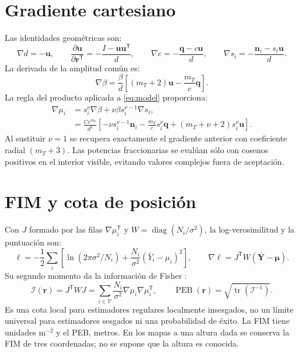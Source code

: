 \documentclass[11pt,a4paper]{article}
\newcommand{\PEB}{\operatorname{PEB}}
\begin{document}
\section{Gradiente cartesiano}
Las identidades geométricas son:
\begin{equation}
 \nabla d=-\mathbf u,\qquad
 \frac{\partial\mathbf u}{\partial\mathbf r^{\mathsf T}}=-\frac{I-\mathbf u\mathbf u^{\mathsf T}}{d},\qquad
 \nabla c=-\frac{\mathbf q-c\mathbf u}{d},\qquad
 \nabla s_i=-\frac{\mathbf n_i-s_i\mathbf u}{d}.
\end{equation}
La derivada de la amplitud común es:
\begin{equation}
 \nabla\beta=\frac{\beta}{d}\left[(m_T+2)\mathbf u-\frac{m_T}{c}\mathbf q\right].
\end{equation}
La regla del producto aplicada a \eqref{eq:model} proporciona:
\begin{align}
 \nabla\mu_i&=s_i^\nu\nabla\beta+\nu\beta s_i^{\nu-1}\nabla s_i,\\
 &=\frac{Cc^{m_T}}{d^3}\left[-\nu s_i^{\nu-1}\mathbf n_i
 -\frac{m_T}{c}s_i^\nu\mathbf q+(m_T+\nu+2)s_i^\nu\mathbf u\right].
\label{eq:gradient}
\end{align}
Al sustituir $\nu=1$ se recupera exactamente el gradiente anterior con coeficiente radial $(m_T+3)$. Las potencias fraccionarias se evalúan sólo con cosenos positivos en el interior visible, evitando valores complejos fuera de aceptación.

\section{FIM y cota de posición}
Con $J$ formado por las filas $\nabla\mu_i^{\mathsf T}$ y $W=\operatorname{diag}(N_i/\sigma^2)$, la log-verosimilitud y la puntuación son:
\begin{equation}
 \ell=-\frac12\sum_i\left[\ln(2\pi\sigma^2/N_i)+\frac{N_i}{\sigma^2}(\bar Y_i-\mu_i)^2\right],\qquad
 \nabla\ell=J^{\mathsf T}W(\bar{\mathbf Y}-\bm\mu).
\end{equation}
Su segundo momento da la información de Fisher \cite{kay}:
\begin{equation}
 \mathcal I(\mathbf r)=J^{\mathsf T}WJ=\sum_{i\in\mathcal V}\frac{N_i}{\sigma^2}\nabla\mu_i\nabla\mu_i^{\mathsf T},\qquad
 \PEB(\mathbf r)=\sqrt{\operatorname{tr}(\mathcal I^{-1})}.
\label{eq:peb}
\end{equation}
Es una cota local para estimadores regulares localmente insesgados, no un límite universal para estimadores sesgados ni una probabilidad de éxito. La FIM tiene unidades $\mathrm m^{-2}$ y el PEB, metros. En los mapas a una altura dada se conserva la FIM de tres coordenadas; no se supone que la altura es conocida.
\end{document}
